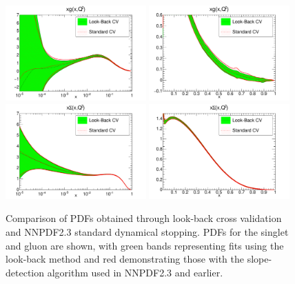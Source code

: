 \begin{figure}[h!]
\centering
\includegraphics[width=0.48\textwidth]{7-PostLHC/figs/LB30kvsDYN/pdf_xg_log.pdf}
\includegraphics[width=0.48\textwidth]{7-PostLHC/figs/LB30kvsDYN/pdf_xg.pdf}\\
\includegraphics[width=0.48\textwidth]{7-PostLHC/figs/LB30kvsDYN/pdf_xsigma_log.pdf}
\includegraphics[width=0.48\textwidth]{7-PostLHC/figs/LB30kvsDYN/pdf_xsigma.pdf}
\caption[Comparison of PDFs obtained through look-back cross validation and NNPDF2.3 standard dynamical stopping]{Comparison of PDFs obtained through look-back cross validation and NNPDF2.3 standard dynamical stopping. PDFs for the singlet and gluon are shown, with green bands representing fits using the look-back method and red demonstrating those with the slope-detection algorithm used in NNPDF2.3 and earlier.}
\label{fig:30kLBvsDYN}
\end{figure}
 
